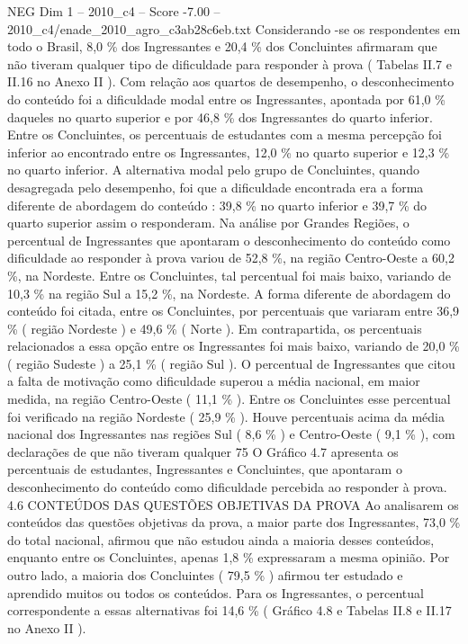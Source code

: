 \begin{textsample}{NEG Dim 1 – 2010\_c4 – Score -7.00 – 2010\_c4/enade\_2010\_agro\_c3ab28c6eb.txt}
Considerando -se os respondentes em todo o Brasil, 8,0 \% dos Ingressantes e 20,4 \% dos Concluintes afirmaram que não tiveram qualquer tipo de dificuldade para responder à prova ( Tabelas II.7 e II.16 no Anexo II ).
Com relação aos quartos de desempenho, o desconhecimento do conteúdo foi a dificuldade modal entre os Ingressantes, apontada por 61,0 \% daqueles no quarto superior e por 46,8 \% dos Ingressantes do quarto inferior.
Entre os Concluintes, os percentuais de estudantes com a mesma percepção foi inferior ao encontrado entre os Ingressantes, 12,0 \% no quarto superior e 12,3 \% no quarto inferior.
A alternativa modal pelo grupo de Concluintes, quando desagregada pelo desempenho, foi que a dificuldade encontrada era a forma diferente de abordagem do conteúdo : 39,8 \% no quarto inferior e 39,7 \% do quarto superior assim o responderam.
Na análise por Grandes Regiões, o percentual de Ingressantes que apontaram o desconhecimento do conteúdo como dificuldade ao responder à prova variou de 52,8 \%, na região Centro-Oeste a 60,2 \%, na Nordeste.
Entre os Concluintes, tal percentual foi mais baixo, variando de 10,3 \% na região Sul a 15,2 \%, na Nordeste.
A forma diferente de abordagem do conteúdo foi citada, entre os Concluintes, por percentuais que variaram entre 36,9 \% ( região Nordeste ) e 49,6 \% ( Norte ).
Em contrapartida, os percentuais relacionados a essa opção entre os Ingressantes foi mais baixo, variando de 20,0 \% ( região Sudeste ) a 25,1 \% ( região Sul ).
O percentual de Ingressantes que citou a falta de motivação como dificuldade superou a média nacional, em maior medida, na região Centro-Oeste ( 11,1 \% ).
Entre os Concluintes esse percentual foi verificado na região Nordeste ( 25,9 \% ).
Houve percentuais acima da média nacional dos Ingressantes nas regiões Sul ( 8,6 \% ) e Centro-Oeste ( 9,1 \% ), com declarações de que não tiveram qualquer 75 O Gráfico 4.7 apresenta os percentuais de estudantes, Ingressantes e Concluintes, que apontaram o desconhecimento do conteúdo como dificuldade percebida ao responder à prova. 4.6 CONTEÚDOS DAS QUESTÕES OBJETIVAS DA PROVA Ao analisarem os conteúdos das questões objetivas da prova, a maior parte dos Ingressantes, 73,0 \% do total nacional, afirmou que não estudou ainda a maioria desses conteúdos, enquanto entre os Concluintes, apenas 1,8 \% expressaram a mesma opinião.
Por outro lado, a maioria dos Concluintes ( 79,5 \% ) afirmou ter estudado e aprendido muitos ou todos os conteúdos.
Para os Ingressantes, o percentual correspondente a essas alternativas foi 14,6 \% ( Gráfico 4.8 e Tabelas II.8 e II.17 no Anexo II ).

\end{textsample}
